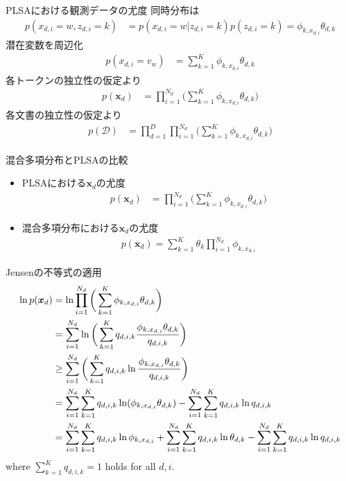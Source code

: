 \documentclass[aspectratio=169,unicode,dvipdfmx,14pt]{beamer}
\begin{document}
\begin{frame}{PLSAにおける観測データの尤度}
\FontMath
同時分布は
\vspace{-.1in}
\begin{align}
p(x_{d,i} = w, z_{d,i} = k ) & = p(x_{d,i} = w | z_{d,i}=k) p(z_{d,i}=k)
= \phi_{k,x_{d,i}} \theta_{d,k}
\end{align}
潜在変数を周辺化
\vspace{-.1in}
\begin{align}
p(x_{d,i}=v_w) & = \sum_{k=1}^K \phi_{k,x_{d,i}} \theta_{d,k}
\end{align}
各トークンの独立性の仮定より
\vspace{-.1in}
\begin{align}
p(\bm{x}_d) & = \prod_{i=1}^{N_d} \bigg( \sum_{k=1}^K \phi_{k, x_{d,i}} \theta_{d,k} \bigg)
\end{align}
各文書の独立性の仮定より
\begin{align}
p(\mathcal{D}) & = \prod_{d=1}^D \prod_{i=1}^{N_d} \bigg( \sum_{k=1}^K \phi_{k, x_{d,i}} \theta_{d,k} \bigg)
\end{align}
\end{frame}

\begin{frame}{混合多項分布とPLSAの比較}
\begin{itemize}
\item PLSAにおける$\bm{x}_d$の尤度
\begin{align}
p(\bm{x}_d) & = \prod_{i=1}^{N_d} \bigg( \sum_{k=1}^K \phi_{k, x_{d,i}} \theta_{d,k} \bigg)
\end{align}
\item 混合多項分布における$\bm{x}_d$の尤度
\begin{align}
p(\bm{x}_d) = \sum_{k=1}^K \theta_k \prod_{i=1}^{N_d} \phi_{k,x_{d,i}}
\end{align}
\end{itemize}
\end{frame}

\begin{frame}{Jensenの不等式の適用}
\FontMath
\vspace{-.15in}
\begin{align}
\ln p(\bm{x}_d) & = \ln \prod_{i=1}^{N_d} \bigg( \sum_{k=1}^K  \phi_{k, x_{d,i}} \theta_{d,k} \bigg)
\notag \\ & 
= \sum_{i=1}^{N_d} \ln \bigg( \sum_{k=1}^K q_{d,i,k} \frac{ \phi_{k, x_{d,i}} \theta_{d,k} }{ q_{d,i,k} } \bigg)
\notag \\
& \geq \sum_{i=1}^{N_d} \bigg( \sum_{k=1}^K q_{d,i,k} \ln \frac{ \phi_{k, x_{d,i}} \theta_{d,k} }{ q_{d,i,k} } \bigg)
\notag \\
& = \sum_{i=1}^{N_d} \sum_{k=1}^K q_{d,i,k} \ln ( \phi_{k, x_{d,i}} \theta_{d,k} )
- \sum_{i=1}^{N_d} \sum_{k=1}^K q_{d,i,k} \ln q_{d,i,k}
\notag \\
& = 
\sum_{i=1}^{N_d} \sum_{k=1}^K q_{d,i,k} \ln \phi_{k, x_{d,i}}
+ \sum_{i=1}^{N_d} \sum_{k=1}^K q_{d,i,k} \ln \theta_{d,k}
- \sum_{i=1}^{N_d} \sum_{k=1}^K q_{d,i,k} \ln q_{d,i,k}
\end{align}
where $\sum_{k=1}^K q_{d,i,k} = 1$ holds for all $d,i$.
\end{frame}
\end{document}

